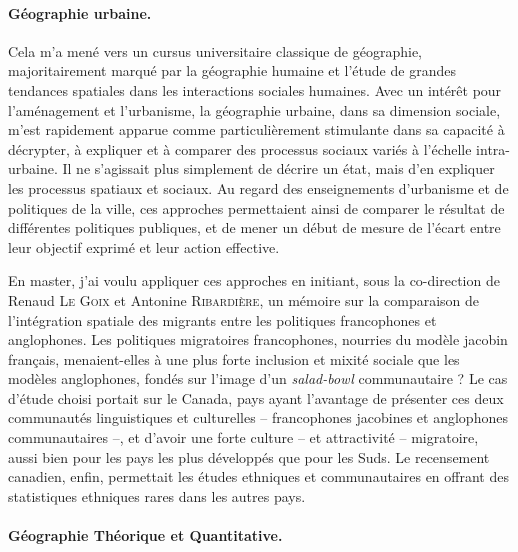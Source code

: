 \paragraph{Géographie urbaine.}

Cela m'a mené vers un cursus universitaire classique de géographie, majoritairement marqué par la géographie humaine et l'étude de grandes tendances spatiales dans les interactions sociales humaines.
Avec un intérêt pour l'aménagement et l'urbanisme, la géographie urbaine, dans sa dimension sociale, m'est rapidement apparue comme particulièrement stimulante dans sa capacité à décrypter, à expliquer et à comparer des processus sociaux variés à l'échelle intra-urbaine.
Il ne s'agissait plus simplement de décrire un état, mais d'en expliquer les processus spatiaux et sociaux.
Au regard des enseignements d'urbanisme et de politiques de la ville, ces approches permettaient ainsi de comparer le résultat de différentes politiques publiques, et de mener un début de mesure de l'écart entre leur objectif exprimé et leur action effective.

En master, j'ai voulu appliquer ces approches en initiant, sous la co-direction de Renaud \textsc{Le Goix} et Antonine \textsc{Ribardière}, un mémoire sur la comparaison de l'intégration spatiale des migrants entre les politiques francophones et anglophones.
Les politiques migratoires francophones, nourries du modèle jacobin français, menaient-elles à une plus forte inclusion et mixité sociale que les modèles anglophones, fondés sur l'image d'un \og \textit{salad-bowl}\fg{} communautaire ?
Le cas d'étude choisi portait sur le Canada, pays ayant l'avantage de présenter ces deux communautés linguistiques et culturelles -- francophones jacobines et anglophones communautaires --, et d'avoir une forte culture -- et attractivité -- migratoire, aussi bien pour les pays les plus développés que pour les Suds.
Le recensement canadien, enfin, permettait les études ethniques et communautaires en offrant des statistiques ethniques rares dans les autres pays.

\paragraph{Géographie Théorique et Quantitative.}

